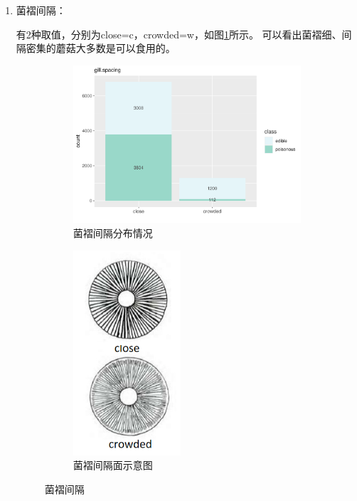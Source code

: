 \documentclass[lang=cn,11pt,a4paper,cite=super]{elegantpaper}
\begin{document}
\begin{enumerate}
   \item 菌褶间隔：\par 有2种取值，分别为close=c，crowded=w，如图\ref{fig:gillspa}所示。
   可以看出菌褶细、间隔密集的蘑菇大多数是可以食用的。
   \begin{figure}[!bht]
      \begin{subfigure}[b]{0.69\textwidth}
        \centering
        \includegraphics[width=\linewidth]{img/gillspacing-1.pdf}  
      \caption{菌褶间隔分布情况}
      \end{subfigure}
      \begin{subfigure}[b]{0.3\textwidth}
        \centering
        \includegraphics[width=0.9\linewidth,height=3in]{img/gillspac.PNG}  
        \caption{菌褶间隔面示意图}
      \end{subfigure}
      \caption{菌褶间隔}
      \label{fig:gillspa}
   \end{figure}


\end{enumerate}
\end{document}
